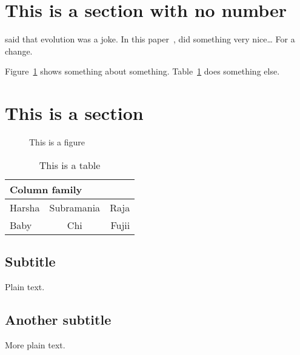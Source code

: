 \section*{This is a section with no number}
	\citet{wsn:exploration:harshita09} said that evolution was a joke. 
	In this paper~\citep{wsn:exploration:harshita09}, did something very nice\ldots
	For a change.
	
	Figure~\ref{f:some-figure} shows something about something.
	Table~\ref{t:some-table} does something else.

\section{This is a section}\label{sec:some}

	\begin{figure}
		\newcommand{\W}{9.1}
		\centering
		\caption{This is a figure}
		\label{f:some-figure}
	\end{figure}

	\begin{table}
		\centering
		\begin{tabular}{lcr}
			\toprule
			\multicolumn{2}{l}{Column family} & \\
			\midrule
			Harsha & Subramania & Raja\\
			Baby & Chi & Fujii\\
			\bottomrule
		\end{tabular}
		\caption{This is a table}
		\label{t:some-table}
		
	\end{table}

\subsection{Subtitle}

Plain text.

\subsection{Another subtitle}

More plain text.
